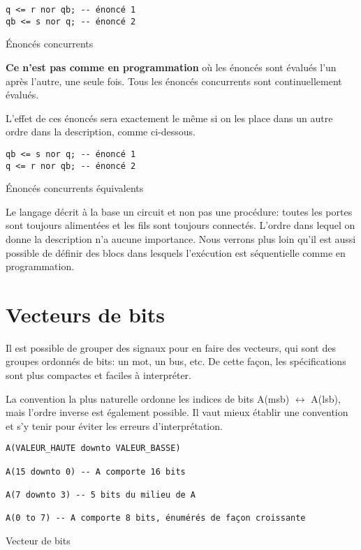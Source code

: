 \documentclass[letter, oneside]{book}
\begin{document}
\begin{listing}[htbp]
\begin{verbatim}
q <= r nor qb; -- énoncé 1
qb <= s nor q; -- énoncé 2
\end{verbatim}
\caption{Énoncés concurrents}
\end{listing}

\textbf{Ce n'est pas comme en programmation} où les énoncés sont évalués
l'un après l'autre, une seule fois. Tous les énoncés concurrents sont
continuellement évalués.

L'effet de ces énoncés sera exactement le même si on les place dans un
autre ordre dans la description, comme ci-dessous.

\begin{listing}[htbp]
\begin{verbatim}
qb <= s nor q; -- énoncé 1
q <= r nor qb; -- énoncé 2
\end{verbatim}
\caption{Énoncés concurrents équivalents}
\end{listing}

Le langage décrit à la base un circuit et non pas une procédure:
toutes les portes sont toujours alimentées et les fils sont toujours
connectés. L'ordre dans lequel on donne la description n'a aucune
importance. Nous verrons plus loin qu'il est aussi possible de définir
des blocs dans lesquels l'exécution est séquentielle comme en
programmation.

\section{Vecteurs de bits}
\label{sec:orgaef080e}

Il est possible de grouper des signaux pour en faire des vecteurs, qui
sont des groupes ordonnés de bits: un mot, un bus, etc. De cette
façon, les spécifications sont plus compactes et faciles à
interpréter.

La convention la plus naturelle ordonne les indices de bits 
A(msb) \(\longleftrightarrow\) A(lsb),
mais l'ordre inverse est également possible. Il vaut mieux établir une
convention et s'y tenir pour éviter les erreurs d'interprétation.

\begin{listing}[htbp]
\begin{verbatim}
A(VALEUR_HAUTE downto VALEUR_BASSE)

A(15 downto 0) -- A comporte 16 bits

A(7 downto 3) -- 5 bits du milieu de A

A(0 to 7) -- A comporte 8 bits, énumérés de façon croissante
\end{verbatim}
\caption{Vecteur de bits}
\end{listing}
\end{document}
